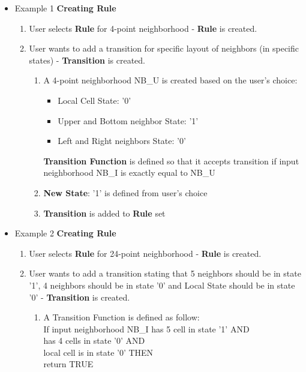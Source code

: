 \documentclass{article}
\begin{document}
\begin{itemize}

\item Example 1 {\bf Creating Rule}
\begin{enumerate}
	\item User selects {\bf Rule} for 4-point neighborhood - {\bf Rule} is created.
	
	\item User wants to add a transition for specific layout of neighbors (in specific states) -
	{\bf Transition} is created.
	
	\begin{enumerate}

		\item A 4-point neighborhood NB\_U is created based on the user's choice:
		
		\begin{itemize}
			\item Local Cell State: '0'
			\item Upper and Bottom neighbor State: '1'
			\item Left and Right neighbors State: '0'
 		\end{itemize}
 		
		{\bf Transition Function} is defined so that it accepts transition if input neighborhood 
		NB\_I is exactly equal to NB\_U
		
		\item {\bf New State}: '1' is defined from user's choice
		
		\item {\bf Transition} is added to {\bf Rule} set
			
	\end{enumerate}	
\end{enumerate}


\item Example 2 {\bf Creating Rule}
\begin{enumerate}
	\item User selects {\bf Rule} for 24-point neighborhood - {\bf Rule} is created.
	\item User wants to add a transition stating that 5 neighbors should be in state '1',
	4 neighbors should be in state '0' and Local State should be in state '0' - 
	{\bf Transition} is created.
	\begin{enumerate}

		\item A Transition Function is defined as follow: \\
		If input neighborhood NB\_I has 5 cell in state '1' AND\\ 
		has 4 cells in state '0' AND\\
		local cell is in state '0' THEN \\
		return TRUE
		

\end{enumerate}
\end{enumerate}
\end{itemize}
\end{document}

